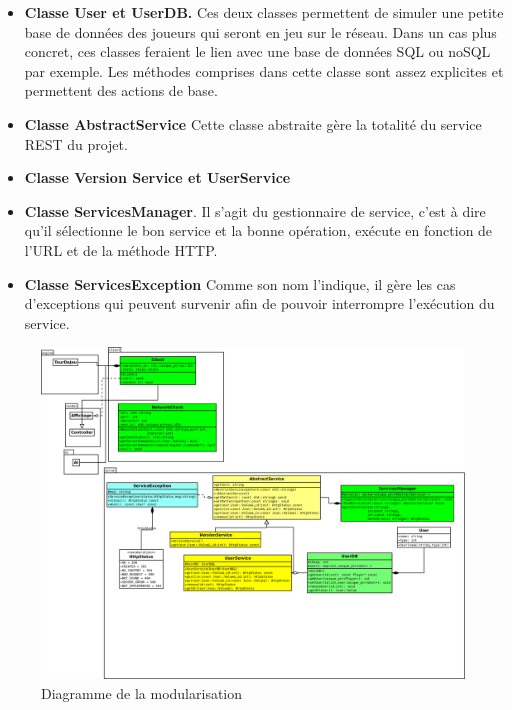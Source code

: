 \begin{itemize}
    \item \textbf{Classe User et UserDB.}
    Ces deux classes permettent de simuler une petite base de données des joueurs qui seront en jeu sur le réseau. Dans un cas plus concret, ces classes feraient le lien avec une base de données SQL ou noSQL par exemple. Les méthodes comprises dans cette classe sont assez explicites et permettent des actions de base. 
    \newline 
    
    \item \textbf{Classe AbstractService}
    Cette classe abstraite gère la totalité du service REST du projet.
    
     \item \textbf{Classe Version Service et UserService}
     
     \item \textbf{Classe ServicesManager}. Il s'agit du gestionnaire de service, c'est à dire qu'il sélectionne le bon service et la bonne opération, exécute en fonction de l'URL et de la méthode HTTP. 
     
     \item \textbf{Classe ServicesException}
     Comme son nom l'indique, il gère les cas d'exceptions qui peuvent survenir afin de pouvoir interrompre l'exécution du service. 
     
     
\end{itemize} 

\begin{landscape}
    \begin{figure}[!htbp]
        \centering
        \includegraphics[width=17cm]{Images/module.png}
        \caption{Diagramme de la modularisation}
        \label{fig:ai}
    \end{figure}
\end{landscape}